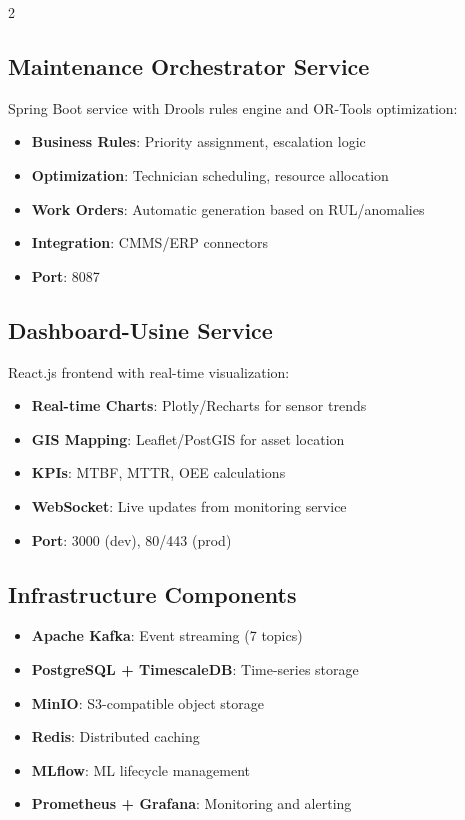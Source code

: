 \documentclass{ijceds} %
\begin{document}
\begin{multicols}{2}
\subsection{Maintenance Orchestrator Service}

Spring Boot service with Drools rules engine and OR-Tools optimization:

\begin{itemize}
    \item \textbf{Business Rules}: Priority assignment, escalation logic
    \item \textbf{Optimization}: Technician scheduling, resource allocation
    \item \textbf{Work Orders}: Automatic generation based on RUL/anomalies
    \item \textbf{Integration}: CMMS/ERP connectors
    \item \textbf{Port}: 8087
\end{itemize}

\subsection{Dashboard-Usine Service}

React.js frontend with real-time visualization:

\begin{itemize}
    \item \textbf{Real-time Charts}: Plotly/Recharts for sensor trends
    \item \textbf{GIS Mapping}: Leaflet/PostGIS for asset location
    \item \textbf{KPIs}: MTBF, MTTR, OEE calculations
    \item \textbf{WebSocket}: Live updates from monitoring service
    \item \textbf{Port}: 3000 (dev), 80/443 (prod)
\end{itemize}

\subsection{Infrastructure Components}

\begin{itemize}
    \item \textbf{Apache Kafka}: Event streaming (7 topics)
    \item \textbf{PostgreSQL + TimescaleDB}: Time-series storage
    \item \textbf{MinIO}: S3-compatible object storage
    \item \textbf{Redis}: Distributed caching
    \item \textbf{MLflow}: ML lifecycle management
    \item \textbf{Prometheus + Grafana}: Monitoring and alerting
\end{itemize}


\end{multicols}
\end{document}

